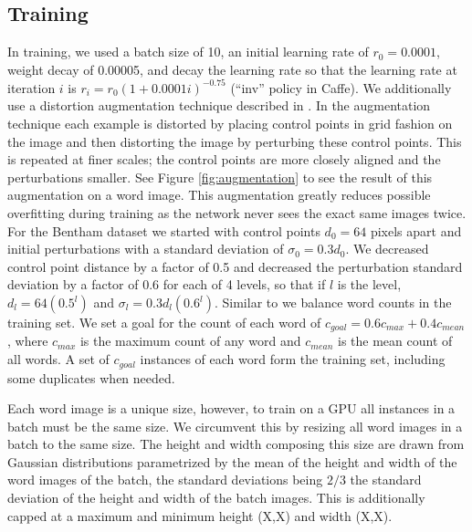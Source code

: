 \documentclass[ms,electronic,twosidetoc,letterpaper,chaptercenter,parttop,lol,lof,lot]{byumsphd}
\begin{document}
\subsection{Training}

In training, we used a batch size of 10, an initial learning rate of $r_0=0.0001$, weight decay of 0.00005, and decay the learning rate so that the learning rate at iteration $i$ is $r_i = r_0 (1 + 0.0001 i)^{-0.75}$ (``inv'' policy in Caffe). We additionally use a distortion augmentation technique described in \cite{wigington2017}. In the augmentation technique each example is distorted by placing control points in grid fashion on the image and then distorting the image by perturbing these control points. This is repeated at finer scales; the control points are more closely aligned and the perturbations smaller. See Figure \ref{fig:augmentation} to see the result of this augmentation on a word image. This augmentation greatly reduces possible overfitting during training as the network never sees the exact same images twice.
For the Bentham dataset we started with control points $d_0 = 64$ pixels apart and initial perturbations with a standard deviation of $\sigma_0 = 0.3 d_0$. We decreased control point distance by a factor of 0.5 and decreased the perturbation standard deviation by a factor of 0.6 for each of 4 levels, so that if $l$ is the level, $d_l = 64(0.5^{l})$ and $\sigma_l = 0.3 d_l (0.6^{l})$.
Similar to \citep{sudholt2016} we balance word counts in the training set. We set a goal for the count of each word of $c_{goal} = 0.6c_{max}+0.4c_{mean}$, where $c_{max}$ is the maximum count of any word and $c_{mean}$ is the mean count of all words. A set of $c_{goal}$ instances of each word form the training set, including some duplicates when needed.

Each word image is a unique size, however, to train on a GPU all instances in a batch must be the same size. We circumvent this by resizing all word images in a batch to the same size. The height and width composing this size are drawn from Gaussian distributions parametrized by the mean of the height and width of
the word images of the batch, the standard deviations being $2/3$ the standard deviation of the height and width of the batch images. This is additionally capped at a maximum and minimum height (X,X) and width (X,X).
\end{document}

